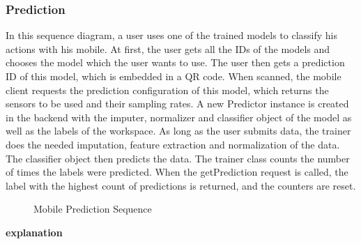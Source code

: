 \subsubsection{Prediction}
In this sequence diagram, a user uses one of the trained models to classify his actions with his mobile. At first, the user gets all the IDs of the models and chooses the model which the user wants to use. The user then gets a prediction ID of this model, which is embedded in a QR code. When scanned, the mobile client requests the prediction configuration of this model, which returns the sensors to be used and their sampling rates. A new Predictor instance is created in the backend with the imputer, normalizer and classifier object of the model as well as the labels of the workspace. As long as the user submits data, the trainer does the needed imputation, feature extraction and normalization of the data. The classifier object then predicts the data. The trainer class counts the number of times the labels were predicted. When the getPrediction request is called, the label with the highest count of predictions is returned, and the counters are reset.
\begin{figure}[!htb]
    \centering
    \caption{Mobile Prediction Sequence}
    \label{fig:seq-predict}
\end{figure}

\textbf{explanation}